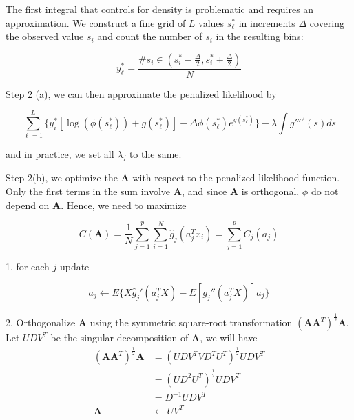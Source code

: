 \documentclass{article}
\begin{document}
The first integral that controls for density is problematic and requires an approximation. We construct a fine grid of $L$ values $s_\ell^*$ in increments $\Delta$ covering the observed value $s_i$ and count the number of $s_i$ in the resulting bins:

\begin{equation}
	y_\ell^* = \frac{\# s_i\in(s_i^* - \frac{\Delta}{2}, s_i^* + \frac{\Delta}{2} )}{N}
\end{equation}

Step 2 (a), we can then approximate the penalized likelihood by

\begin{equation}
	\sum_{\ell = 1}^L \Big\{ y_i^*[\log(\phi(s_\ell^*)) + g(s_\ell^*) ] - \Delta \phi(s_\ell^*)e^{g(s_\ell^*)} \Big\} - \lambda \int g'''^2(s)ds
\end{equation}

and in practice, we set all $\lambda_j$ to the same.

Step 2(b), we optimize the $\pmb A$ with respect to the penalized likelihood function. Only the first terms in the sum involve $\pmb A$, and since $\pmb A$ is orthogonal, $\phi$ do not depend on $\pmb A$. Hence, we need to maximize

\begin{equation}
	C(\pmb A) = \frac{1}{N}\sum_{j=1}^p \sum_{i=1}^N \hat g_j(a_j^Tx_i) = \sum_{j=1}^p C_j(a_j)
\end{equation}

1. for each $j$ update

\begin{equation}
	a_j \longleftarrow E\bigg\{ X\hat g_j'(a_j^TX) - E[g_j''(a_j^TX)]a_j \bigg\}
\end{equation}

2. Orthogonalize $\pmb A$ using the symmetric square-root transformation $(\pmb A\pmb A^T)^{\frac{1}{2}}\pmb A$. Let $UDV^T$ be the singular decomposition of $\pmb A$, we will have 
\begin{align}
	(\pmb A\pmb A^T)^{\frac{1}{2}}\pmb A &= (UDV^T VD^TU^T)^{\frac{1}{2}} UDV^T\\
	& = (UD^2U^T)^{\frac{1}{2}}UDV^T\\
	& = D^{-1}UDV^T\\
	 \pmb A &\leftarrow  UV^T
\end{align}
\end{document}
